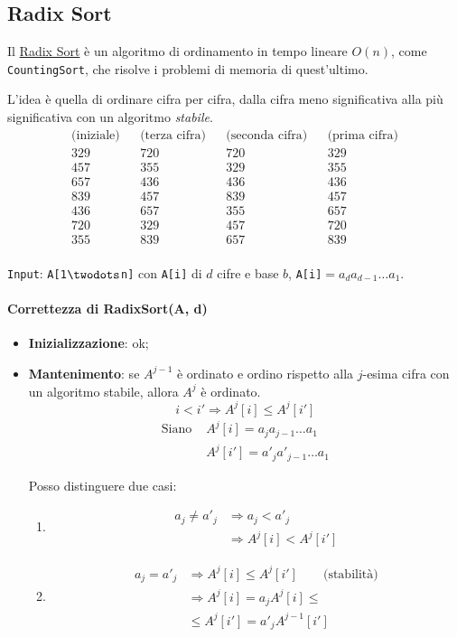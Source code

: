 \subsection{Radix Sort}
Il \href{https://en.wikipedia.org/wiki/Radix_sort}{Radix Sort} è un algoritmo di ordinamento in tempo
lineare $O(n)$, come \texttt{CountingSort}, che risolve i problemi di memoria di quest'ultimo.

L'idea è quella di ordinare cifra per cifra, dalla cifra meno significativa alla più significativa con un 
algoritmo \emph{stabile}.
\begin{align*}
	\text{(iniziale)} && \text{(terza cifra)} && \text{(seconda cifra)} && \text{(prima cifra)} \\
	329 && 720 && 720 && 329 \\
	457 && 355 && 329 && 355 \\
	657 && 436 && 436 && 436 \\
	839 && 457 && 839 && 457 \\
	436 && 657 && 355 && 657 \\
	720 && 329 && 457 && 720 \\
	355 && 839 && 657 && 839 \\
\end{align*}

\texttt{Input}: \texttt{A[1$\twodots$n]} con \texttt{A[i]} di $d$ cifre e base $b$,
\texttt{A[i]}$= a_d a_{d-1}\dots a_1$.



\paragraph{Correttezza di RadixSort(A, d)}
\begin{itemize}
	\item \textbf{Inizializzazione}: ok;
	\item \textbf{Mantenimento}: se $A^{j-1}$ è ordinato e ordino rispetto alla $j$-esima cifra con
	un algoritmo stabile, allora $A^j$ è ordinato.
	$$i < i' \Rightarrow A^j[i] \leq A^j[i']$$
	\begin{align*}
		\text{Siano } & A^j[i] = a_j a_{j-1} \dots a_1 \\
		& A^j[i'] = a'_j a'_{j-1} \dots a_1
	\end{align*}
	
	Posso distinguere due casi:
	\begin{enumerate}
		\item \begin{align*}
			a_j \neq a'_j & \Rightarrow a_j < a'_j \\
			& \Rightarrow A^j[i] < A^j[i']
		\end{align*}
		\item \begin{align*}
			a_j = a'_j & \Rightarrow A^j[i] \leq A^j[i'] \qquad \text{(stabilità)}\\
			& \Rightarrow A^j[i] = a_j A^j[i] \leq \\
			& \leq A^j[i'] = a'_j A^{j-1}[i']
		\end{align*}
	\end{enumerate}
\end{itemize}

